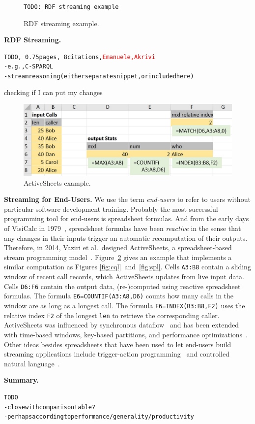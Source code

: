 \begin{figure}[!h]
\begin{lstlisting}
TODO: RDF streaming example
\end{lstlisting}
\vspace*{-4mm}
\caption{\label{fig:rdf}RDF streaming example.}
\end{figure}

\textbf{RDF Streaming.}
\begin{alltt}TODO\scriptsize, ~0.75 pages, ~8 citations, \textcolor{red}{Emanuele, Akrivi}
- e.g., C-SPARQL \cite{barbieri_et_al_2009}
- stream reasoning (either separate snippet, or included here)
\end{alltt}

checking if I can put my changes

\begin{figure}[!h]
\centerline{\includegraphics[width=\columnwidth]{CallStats.jpg}}
\vspace*{-4mm}
\caption{\label{fig:activesheets}ActiveSheets example.}
\end{figure}

\textbf{Streaming for End-Users.}
%
We use the term \emph{end-users} to refer to users without particular
software development training. Probably the most successful
programming tool for end-users is spreadsheet formulas. And from the
early days of VisiCalc in 1979~\cite{bricklin_frankston_1979},
spreadsheet formulas have been \emph{reactive} in the sense that any
changes in their inputs trigger an automatic recomputation of their
outputs. Therefore, in 2014, Vaziri et al.\ designed ActiveSheets, a
spreadsheet-based stream programming model~\cite{vaziri_et_al_2014}.
Figure~\ref{fig:activesheets} gives an example that implements a
similar computation as Figures \mbox{\ref{fig:cql} and \ref{fig:spl}}.
Cells \lstinline{A3:B8} contain a sliding window of recent call
records, which ActiveSheets updates from live input data. Cells
\lstinline{D6:F6} contain the output data, \mbox{(re-)}com\-pu\-ted
using reactive spreadsheet formulas. The formula
\mbox{\lstinline{E6=COUNTIF(A3:A8,D6)}} counts how many calls in the
window are as long as a longest call. The formula
\mbox{\lstinline{F6=INDEX(B3:B8,F2)}} uses the relative index \lstinline{F2}
of the longest \lstinline{len} to retrieve the corresponding
caller.  ActiveSheets was influenced by
synchronous data\-flow~\cite{lustre_1987} and has been extended with
time-based windows, key-based partitions, and performance
optimizations~\cite{hirzel_et_al_2016}. Other ideas besides
spreadsheets that have been used to let end-users build streaming
applications include trigger-action programming~\cite{ifttt} and
controlled natural language~\cite{arnold_et_al_2016}.

\textbf{Summary.}
\begin{alltt}TODO\scriptsize
- close with comparison table?
- perhaps according to performance/generality/productivity
\end{alltt}
